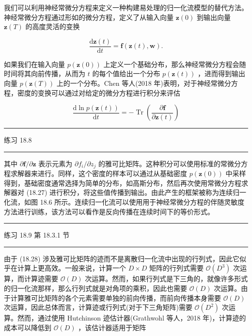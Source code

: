 \documentclass[10pt]{article}
\newcommand{\HRule}{\begin{center}\rule{0.9\linewidth}{0.2mm}\end{center}}
\begin{document}
我们可以利用神经常微分方程来定义一种构建易处理的归一化流模型的替代方法。神经常微分方程通过形如的微分方程，定义了从输入向量 \(\mathbf{z}\left( 0\right)\) 到输出向量 \(\mathbf{z}\left( T\right)\) 的高度灵活的变换

\[
\frac{\mathrm{d}\mathbf{z}\left( t\right) }{\mathrm{d}t} = \mathbf{f}\left( {\mathbf{z}\left( t\right) ,\mathbf{w}}\right) . \tag{18.27}
\]

如果我们在输入向量 \(p\left( {\mathbf{z}\left( 0\right) }\right)\) 上定义一个基础分布，那么神经常微分方程会随时间将其向前传播，从而为 \(t\) 的每个值给出一个分布 \(p\left( {\mathbf{z}\left( t\right) }\right)\) ，进而得到输出向量 \(p\left( {\mathbf{z}\left( T\right) }\right)\) 上的一个分布。Chen 等人(2018 年)表明，对于神经常微分方程，密度的变换可以通过对给定的微分方程进行积分来评估

\[
\frac{\mathrm{d}\ln p\left( {\mathbf{z}\left( t\right) }\right) }{\mathrm{d}t} =  - \operatorname{Tr}\left( \frac{\partial \mathbf{f}}{\partial \mathbf{z}\left( t\right) }\right)  \tag{18.28}
\]

\HRule

练习 18.8

\HRule

其中 \(\partial \mathbf{f}/\partial \mathbf{z}\) 表示元素为 \(\partial {f}_{i}/\partial {z}_{j}\) 的雅可比矩阵。这种积分可以使用标准的常微分方程求解器来进行。同样，这个密度的样本可以通过从基础密度 \(p\left( {\mathbf{z}\left( 0\right) }\right)\) 中采样得到，基础密度通常选择为简单的分布，如高斯分布，然后再次使用常微分方程求解器对 (18.27) 进行积分，将这些值传播到输出。由此产生的框架被称为连续归一化流，如图 18.6 所示。连续归一化流可以使用用于神经常微分方程的伴随灵敏度方法进行训练，该方法可以看作是反向传播在连续时间下的等价形式。

\HRule

练习 18.9 第 18.3.1 节

\HRule

由于 (18.28) 涉及雅可比矩阵的迹而不是离散归一化流中出现的行列式，因此它似乎在计算上更高效。一般来说，计算一个 \(D \times  D\) 矩阵的行列式需要 \(\mathcal{O}\left( {D}^{3}\right)\) 次运算，而计算迹需要 \(\mathcal{O}\left( D\right)\) 次运算。然而，如果行列式是下三角的，就像许多形式的归一化流那样，那么行列式就是对角项的乘积，因此也需要 \(\mathcal{O}\left( D\right)\) 次运算。由于计算雅可比矩阵的各个元素需要单独的前向传播，而前向传播本身需要 \(\mathcal{O}\left( D\right)\) 次运算，因此总体而言，计算迹或行列式(对于下三角矩阵)需要 \(\mathcal{O}\left( {D}^{2}\right)\) 次运算。然而，通过使用 Hutchinson 迹估计器(Grathwohl 等人，2018 年)，计算迹的成本可以降低到 \(\mathcal{O}\left( D\right)\) ，该估计器适用于矩阵
\end{document}
